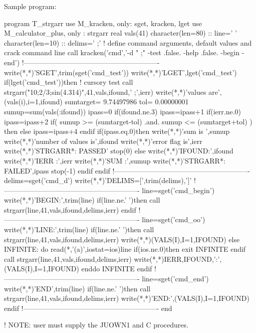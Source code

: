 \begin{DoxyVerb}Sample program:

   program T_strgarr
   use M_kracken, only: sget, kracken, lget
   use M_calculator_plus, only : strgarr
   real vals(41)
   character(len=80) :: line=' '
   character(len=10) :: delims=' ;'
   !  define command arguments, default values and crack command line
   call kracken('cmd','-d " ;" -test .false. -help .false. -begin -end')
   !----------------------------------------------------------
   write(*,*)'SGET',trim(sget('cmd_test'))
   write(*,*)'LGET',lget('cmd_test')
   if(lget('cmd_test'))then   ! cursory test
      call strgarr("10;2/3;sin(4.314)",41,vals,ifound,' ;',ierr)
      write(*,*)'values are',(vals(i),i=1,ifound)
      sumtarget= 9.74497986
      tol=       0.00000001
      sumup=sum(vals(:ifound))
      ipass=0
      if(ifound.ne.3) ipass=ipass+1
      if(ierr.ne.0)   ipass=ipass+2
      if( sumup >= (sumtarget-tol) .and. sumup <= (sumtarget+tol) ) then
      else
         ipass=ipass+4
      endif
      if(ipass.eq.0)then
         write(*,*)'sum is ',sumup
         write(*,*)'number of values is',ifound
         write(*,*)'error flag is',ierr
         write(*,*)'STRGARR*: PASSED'
         stop(0)
      else
         write(*,*)'IFOUND:',ifound
         write(*,*)'IERR  :',ierr
         write(*,*)'SUM   :',sumup
         write(*,*)'STRGARR*: FAILED',ipass
         stop(-1)
      endif
   endif
   !----------------------------------------------------------
   delims=sget('cmd_d')
   write(*,*)'DELIMS=[',trim(delims),']'
   !----------------------------------------------------------
   line=sget('cmd_begin')
   write(*,*)'BEGIN:',trim(line)
   if(line.ne.' ')then
      call strgarr(line,41,vals,ifound,delims,ierr)
   endif
   !----------------------------------------------------------
   line=sget('cmd_oo')
   write(*,*)'LINE:',trim(line)
   if(line.ne.' ')then
      call strgarr(line,41,vals,ifound,delims,ierr)
      write(*,*)(VALS(I),I=1,IFOUND)
   else
      INFINITE: do
         read(*,'(a)',iostat=ios)line
         if(ios.ne.0)then
            exit INFINITE
         endif
         call strgarr(line,41,vals,ifound,delims,ierr)
         write(*,*)IERR,IFOUND,':',(VALS(I),I=1,IFOUND)
      enddo INFINITE
   endif
   !----------------------------------------------------------
   line=sget('cmd_end')
   write(*,*)'END',trim(line)
   if(line.ne.' ')then
      call strgarr(line,41,vals,ifound,delims,ierr)
      write(*,*)'END:',(VALS(I),I=1,IFOUND)
   endif
   !----------------------------------------------------------
   end

   ! NOTE: user must supply the JUOWN1 and C procedures.
\end{DoxyVerb}


